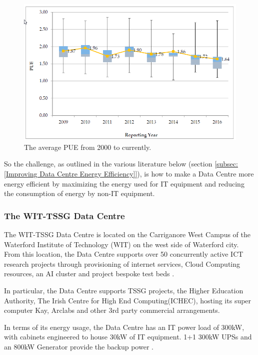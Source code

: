 \documentclass[12pt]{scrartcl}
\begin{document}
\begin{figure}[h]
  \caption{The average PUE from 2000 to currently.}
  \label{fig:PUE-by-year}
  \centering
    \includegraphics[scale=0.35]{Average_PUE_per_reporting_year.png}
\end{figure}
 
So the challenge, as outlined in the various literature below (section \ref{subsec:[Improving Data Centre Energy Efficiency]}), is how to make a Data Centre more energy efficient by maximizing the energy used for IT equipment and reducing the consumption of energy by non-IT equipment. 



\subsubsection{The WIT-TSSG Data Centre}
\label{subsubsec:[The WIT-TSSG Data Centre]}

The WIT-TSSG Data Centre is located on the Carriganore West Campus of the Waterford Institute of Technology (WIT) on the west side of Waterford city. From this location, the Data Centre supports over 50 concurrently active ICT research projects through provisioning of internet services, Cloud Computing resources, an AI cluster and project bespoke test beds \citep{TSSG}. 

In particular, the Data Centre supports TSSG projects, the Higher Education Authority, The Irish Centre for High End Computing(ICHEC), hosting its super computer Kay, Arclabs and other 3rd party commercial arrangements.

In terms of its energy usage, the Data Centre has an IT power load of 300kW, with cabinets engineered to house 30kW of IT equipment. 1+1 300kW UPSs and an 800kW Generator provide the backup power \citep{TSSG}.
\end{document}
